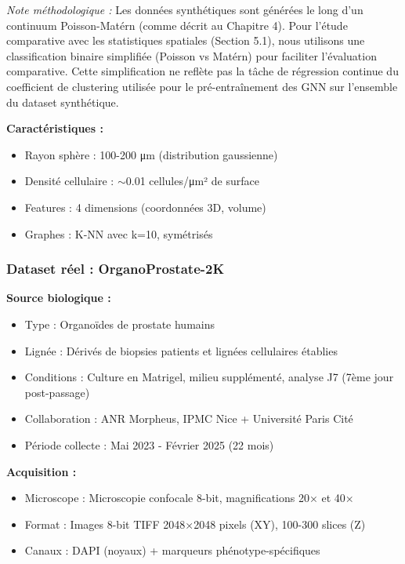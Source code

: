 \textit{Note méthodologique :} Les données synthétiques sont générées le long d'un continuum Poisson-Matérn (comme décrit au Chapitre 4). Pour l'étude comparative avec les statistiques spatiales (Section 5.1), nous utilisons une classification binaire simplifiée (Poisson vs Matérn) pour faciliter l'évaluation comparative. Cette simplification ne reflète pas la tâche de régression continue du coefficient de clustering utilisée pour le pré-entraînement des GNN sur l'ensemble du dataset synthétique.

\textbf{Caractéristiques :}
\begin{itemize}
    \item Rayon sphère : 100-200 μm (distribution gaussienne)
    \item Densité cellulaire : $\sim$0.01 cellules/μm² de surface
    \item Features : 4 dimensions (coordonnées 3D, volume)
    \item Graphes : K-NN avec k=10, symétrisés
\end{itemize}

\subsubsection{Dataset réel : OrganoProstate-2K}

\textbf{Source biologique :}
\begin{itemize}
    \item Type : Organoïdes de prostate humains
    \item Lignée : Dérivés de biopsies patients et lignées cellulaires établies
    \item Conditions : Culture en Matrigel, milieu supplémenté, analyse J7 (7ème jour post-passage)
    \item Collaboration : ANR Morpheus, IPMC Nice + Université Paris Cité
    \item Période collecte : Mai 2023 - Février 2025 (22 mois)
\end{itemize}

\textbf{Acquisition :}
\begin{itemize}
    \item Microscope : Microscopie confocale 8-bit, magnifications 20× et 40×
    \item Format : Images 8-bit TIFF 2048×2048 pixels (XY), 100-300 slices (Z)
    \item Canaux : DAPI (noyaux) + marqueurs phénotype-spécifiques
\end{itemize}

